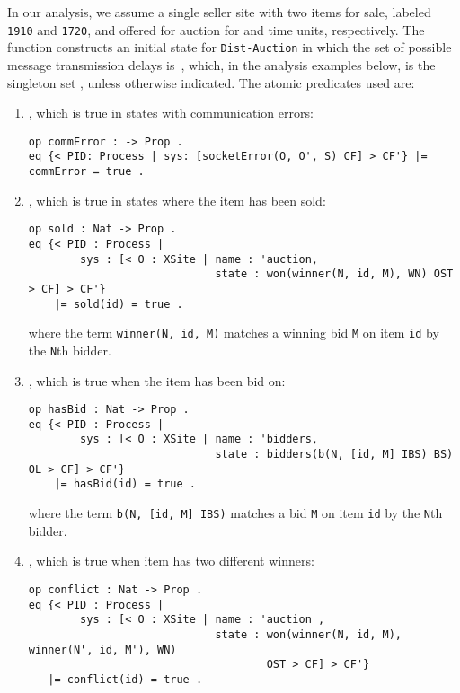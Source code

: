 \documentclass{eptcs}
\begin{document}
In our analysis, we assume a single seller site with two items for sale, labeled \texttt{1910} and \texttt{1720}, and offered for auction for  and  time units, respectively. The function  constructs an initial state for \texttt{Dist-Auction} in which the set of possible message transmission delays is~, which, in the analysis examples below, is the singleton set , unless otherwise indicated. The atomic predicates used are: 
\begin{enumerate}
\item , which is true in states with communication errors:

\begin{small}
\begin{verbatim}
op commError : -> Prop .
eq {< PID: Process | sys: [socketError(O, O', S) CF] > CF'} |= commError = true .
\end{verbatim}
\end{small}

\item , which is true in states where the item  has been sold: 

\begin{small}
\begin{verbatim}
op sold : Nat -> Prop .
eq {< PID : Process | 
        sys : [< O : XSite | name : 'auction, 
                             state : won(winner(N, id, M), WN) OST > CF] > CF'} 
    |= sold(id) = true .
\end{verbatim}
\end{small}

\noindent where the term \texttt{winner(N, id, M)} matches a winning bid \texttt{M} on item \texttt{id} by the \texttt{N}th bidder.

\item , which is true when the item  has been bid on:

\begin{small}
\begin{verbatim}
op hasBid : Nat -> Prop .
eq {< PID : Process | 
        sys : [< O : XSite | name : 'bidders, 
                             state : bidders(b(N, [id, M] IBS) BS) OL > CF] > CF'} 
    |= hasBid(id) = true .
\end{verbatim}
\end{small}

\noindent where the term \texttt{b(N, [id, M] IBS)} matches a bid \texttt{M} on item \texttt{id} by the \texttt{N}th bidder.

\item , which is true when item  has two different winners:

\begin{small}
\begin{verbatim}
op conflict : Nat -> Prop .
eq {< PID : Process | 
        sys : [< O : XSite | name : 'auction , 
                             state : won(winner(N, id, M), winner(N', id, M'), WN) 
                                     OST > CF] > CF'} 
   |= conflict(id) = true .
\end{verbatim}
\end{small}

\end{enumerate}
\end{document}
